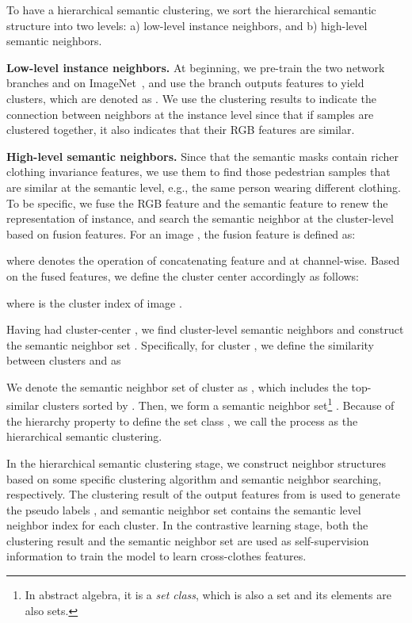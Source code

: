 \documentclass[10pt,twocolumn,letterpaper]{article}
\newcommand{\myparagraph}[1]{\noindent\textbf{#1.}}
\def\eg{e.g.}
\begin{document}
To have a hierarchical semantic clustering, we sort the hierarchical semantic structure into two levels: a) low-level instance neighbors, and b) high-level semantic neighbors.

\myparagraph{Low-level instance neighbors} At beginning, we pre-train the two network branches  and  on ImageNet~\cite{Krizhevsky:NIPS12}, and use the branch  outputs features to yield  clusters, which are denoted as .  
We use the clustering results  to indicate the connection between neighbors at the instance level since that if samples are clustered together, it also indicates that their RGB features are similar.

\myparagraph{High-level semantic neighbors} 
Since that the semantic masks contain richer clothing invariance features, we use them to find those pedestrian samples that are similar at the semantic level, \eg, the same person wearing different clothing. To be specific, we fuse the RGB feature and the semantic feature to renew the representation of instance, and search the semantic neighbor at the cluster-level based on fusion features.
For an image , the fusion feature  is defined as:

where  denotes the operation of concatenating feature  and  at channel-wise. Based on the fused features, we define the cluster center  accordingly as follows:

where  is the cluster index of image . 


Having had cluster-center , we find cluster-level semantic neighbors and construct the semantic neighbor set . 
Specifically, for cluster , we define the similarity between clusters  and  as 

We denote the semantic neighbor set of cluster  as , 
which includes the top- similar clusters  sorted by . 
Then, we form a semantic neighbor set\footnote{In abstract algebra, it is a {\it set class}, which is also a set and its elements are also sets.} . Because of the hierarchy property to define the set class , we call the process as the hierarchical semantic clustering. 


In the hierarchical semantic clustering stage, we construct neighbor structures based on some specific clustering algorithm and semantic neighbor searching, respectively. The clustering result of the output features  from  is used to generate the pseudo labels , and semantic neighbor set  contains the semantic level neighbor index for each cluster. 
In the contrastive learning stage, both the clustering result and the semantic neighbor set are used as self-supervision information to train the model to learn cross-clothes features.
\end{document}
